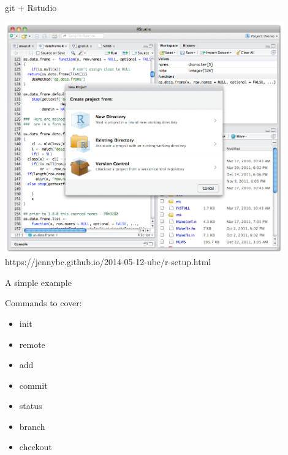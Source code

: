 \documentclass[12pt]{beamer}
\begin{document}
\begin{frame}

	\begin{flushright}
		\Large \textcolor{boss2}{git} + \textcolor{boss4}{Rstudio} 
	\end{flushright}

	\begin{center}
	  \includegraphics[width=0.9\textwidth]{figs/rstudio.png}
		https://jennybc.github.io/2014-05-12-ubc/r-setup.html
	\end{center}

\end{frame}








\begin{frame}

	\begin{flushright}
	\Large \textcolor{boss2}{A simple example} 
	\end{flushright}

	\textcolor{boss3}{Commands to cover:}

	\begin{itemize}
		\item init
		\item remote
		\item add
		\item commit
		\item status
		\item branch
		\item checkout
	\end{itemize}

\end{frame}
\end{document}

